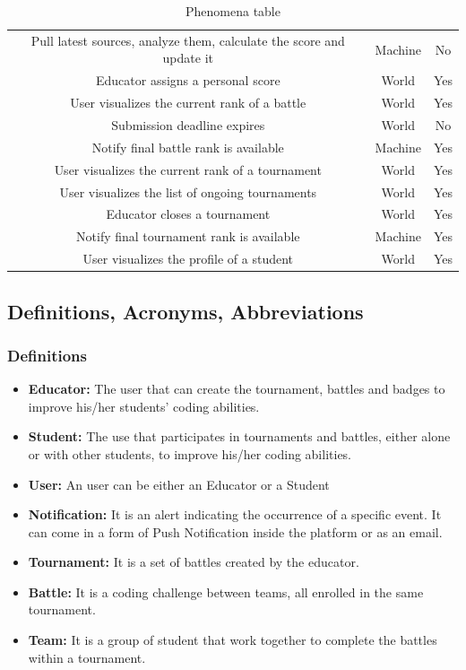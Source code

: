 \documentclass[12pt,oneside,a4paper]{article}
\begin{document}
\begin{table}[htbp]
\begin{adjustbox}{center}
\begin{tabular}{|c|c|c|}
        Pull latest sources, analyze them, calculate the score and update it & Machine & No\\
        Educator assigns a personal score & World & Yes\\
        User visualizes the current rank of a battle & World & Yes\\
        Submission deadline expires & World & No\\
        Notify final battle rank is available & Machine & Yes\\
        User visualizes the current rank of a tournament & World & Yes\\
        User visualizes the list of ongoing tournaments & World & Yes\\
        Educator closes a tournament & World & Yes\\
        Notify final tournament rank is available & Machine & Yes\\
        User visualizes the profile of a student & World & Yes\\ 
        \hline
    \end{tabular}
    \end{adjustbox}
    \caption{Phenomena table}
\end{table}


\subsection{Definitions, Acronyms, Abbreviations}
\subsubsection{Definitions}
\begin{itemize}
    \item \textbf{Educator:} The user that can create the tournament, battles and badges to improve his/her students' coding abilities.
    \item \textbf{Student:} The use that participates in tournaments and battles, either alone or with other students, to improve his/her coding abilities.
    \item \textbf{User:} An user can be either an Educator or a Student
    \item \textbf{Notification:} It is an alert indicating the occurrence of a specific event. It can come in a form of Push Notification inside the platform or as an email.
    \item \textbf{Tournament:} It is a set of battles created by the educator.
    \item \textbf{Battle:} It is a coding challenge between teams, all enrolled in the same tournament.
    \item \textbf{Team:} It is a group of student that work together to complete the battles within a tournament.
\end{itemize}
\end{document}
